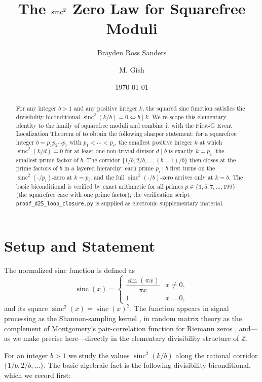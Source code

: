 \documentclass[11pt,reqno]{amsart}
\title[The sinc\texorpdfstring{$^2$}{\^{}2} zero law for squarefree moduli]{The \texorpdfstring{$\sinc^2$}{sinc\^{}2} Zero Law for Squarefree Moduli}
\author{Brayden Ross Sanders}
\author{M. Gish}
\date{\today}
\theoremstyle{plain}
\theoremstyle{remark}
\DeclareMathOperator{\sinc}{sinc}
\newcommand{\Z}{\mathbb{Z}}
\begin{document}
\begin{abstract}
For any integer $b > 1$ and any positive integer $k$, the squared
sinc function satisfies the divisibility biconditional
$\sinc^2(k/b) = 0 \iff b \mid k$. We re-scope this elementary
identity to the family of squarefree moduli and combine it with the
First-G Event Localization Theorem of \cite{J04} to obtain the
following sharper statement: for a squarefree integer
$b = p_1 p_2 \cdots p_r$ with $p_1 < \cdots < p_r$, the smallest
positive integer $k$ at which $\sinc^2(k/d) = 0$ for at least one
non-trivial divisor $d \mid b$ is exactly $k = p_1$, the smallest
prime factor of $b$. The corridor
$\{1/b, 2/b, \ldots, (b-1)/b\}$ then closes at the prime factors of
$b$ in a layered hierarchy: each prime $p_i \mid b$ first turns on
the $\sinc^2(\cdot/p_i)$-zero at $k = p_i$, and the full
$\sinc^2(\cdot/b)$-zero arrives only at $k = b$. The basic
biconditional is verified by exact arithmetic for all primes
$p \in \{3, 5, 7, \ldots, 199\}$ (the squarefree case with one prime
factor); the verification script
\texttt{proof\_d25\_loop\_closure.py} is supplied as electronic
supplementary material.
\end{abstract}

\maketitle

\section{Setup and Statement}\label{sec:setup}

The normalized sinc function is defined as
\begin{equation}\label{eq:sinc-def}
  \sinc(x) =
  \begin{cases}
     \dfrac{\sin(\pi x)}{\pi x} & x \neq 0,\\[4pt]
     1 & x = 0,
  \end{cases}
\end{equation}
and its square $\sinc^2(x) = \sinc(x)^2$. The function appears in
signal processing as the Shannon-sampling kernel
\cite{Shannon1949}, in random matrix theory as the complement of
Montgomery's pair-correlation function for Riemann zeros
\cite{Montgomery1973}, and---as we make precise here---directly in
the elementary divisibility structure of $\Z$.

For an integer $b > 1$ we study the values $\sinc^2(k/b)$ along the
rational corridor $\{1/b, 2/b, \ldots\}$. The basic algebraic fact
is the following divisibility biconditional, which we record first:
\end{document}
